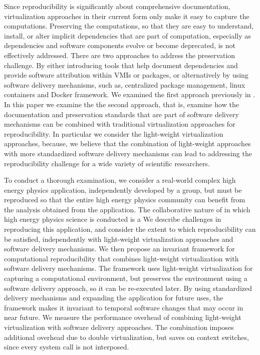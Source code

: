 Since reproducibility is significantly about comprehensive documentation, virtualization approaches in their current form only make it easy to capture the computations. Preserving the computations, so that they are easy to understand, install, or alter implicit dependencies that are part of computation, especially as dependencies and software components evolve or become deprecated, is not effectively addressed. There are two approaches to address the preservation challenge. By either introducing tools that help document dependencies and provide software attribution within VMIs or packages, or alternatively by using software delivery mechanisms, such as, centralized package management, linux containers and Docker framework. We examined the first approach previously in \cite{}. In this paper we examine the the second approach, that is, examine how the documentation and preservation standards that are part of software delivery mechanisms can be combined with traditional virtualization approaches for reproducibility. In particular we consider the light-weight virtualization approaches, because, we believe that the combination of light-weight approaches with more standardized software delivery mechanisms can lead to addressing the reproducibility challenge for a wide variety of scientific researchers. 

To conduct a thorough examination, we consider a real-world complex high energy physics application, independently developed by a group, but must be reproduced  so that the entire high energy physics community can benefit from the analysis obtained from the application. The collaborative nature of in which high energy physics science is conducted is a 
We describe challenges in reproducing this application, and consider the extent to which reproducibility can be satisfied, independently with light-weight virtualization approaches and software delivery mechanisms. We then propose an invariant framework for computational reproducibility that combines light-weight virtualization with software delivery mechanisms. The framework uses light-weight virtualization for capturing a computational environment, but preserves the environment using a software delivery approach, so it can be re-executed later. By using standardized delivery mechanisms and expanding the application for future uses, the framework makes it invariant to temporal software changes that may occur in near future. We measure the performance overhead of combining light-weight virtualization with software delivery approaches. The combination imposes additional overhead due to double virtualization, but saves on context switches, since every system call is not interposed. 

